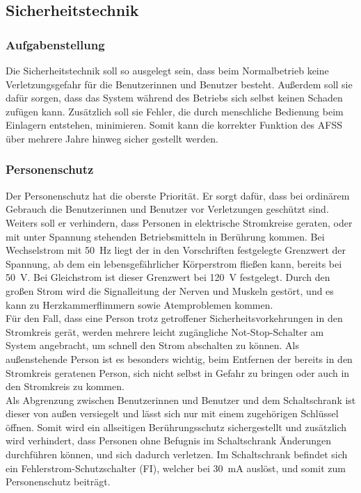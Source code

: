 \subsection{Sicherheitstechnik}
\subsubsection{Aufgabenstellung}
Die Sicherheitstechnik soll so ausgelegt sein, dass beim Normalbetrieb keine Verletzungsgefahr für die Benutzerinnen und Benutzer besteht. Außerdem soll sie dafür sorgen, dass das System während des Betriebs sich selbst keinen Schaden zufügen kann. Zusätzlich soll sie Fehler, die durch menschliche Bedienung beim Einlagern entstehen, minimieren. Somit kann die korrekter Funktion des AFSS über mehrere Jahre hinweg sicher gestellt werden.

\subsubsection{Personenschutz}\label{sc: Personenschutz}
Der Personenschutz hat die oberste Priorität. Er sorgt dafür, dass bei ordinärem Gebrauch die Benutzerinnen und Benutzer vor Verletzungen geschützt sind. Weiters soll er verhindern, dass Personen in elektrische Stromkreise geraten, oder mit unter Spannung stehenden Betriebsmitteln in Berührung kommen. Bei Wechselstrom mit \qty{50}{\hertz} liegt der in den Vorschriften festgelegte Grenzwert der Spannung, ab dem ein lebensgefährlicher Körperstrom fließen kann, bereits bei \qty{50}{\volt}. Bei Gleichstrom ist dieser Grenzwert bei \qty{120}{\volt} festgelegt.\cite{SeyrRösch} Durch den großen Strom wird die Signalleitung der Nerven und Muskeln gestört, und es kann zu Herzkammerflimmern sowie Atemproblemen kommen.\cite{Gefahr_el_Strom}\\
Für den Fall, dass eine Person trotz getroffener Sicherheitsvorkehrungen in den Stromkreis gerät, werden mehrere leicht zugängliche Not-Stop-Schalter am System angebracht, um schnell den Strom abschalten zu können. Als außenstehende Person ist es besonders wichtig, beim Entfernen der bereits in den Stromkreis geratenen Person, sich nicht selbst in Gefahr zu bringen oder auch in den Stromkreis zu kommen.\\
Als Abgrenzung zwischen Benutzerinnen und Benutzer und dem Schaltschrank ist dieser von außen versiegelt und lässt sich nur mit einem zugehörigen Schlüssel öffnen. Somit wird ein allseitigen Berührungsschutz sichergestellt und zusätzlich wird verhindert, dass Personen ohne Befugnis im Schaltschrank Änderungen durchführen können, und sich dadurch verletzen. Im Schaltschrank befindet sich ein Fehlerstrom-Schutzschalter (FI), welcher bei \qty{30}{\milli\ampere} auslöst, und somit zum Personenschutz beiträgt.

